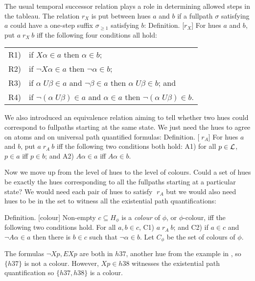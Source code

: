 \documentclass[submission,copyright,creativecommons]{eptcs}
\newcommand{\unt}{\;{U}}
\newcommand{\tom}{{X}}
\newcommand{\pos}{{E}}
\newcommand{\nec}{{A}}
\newcommand{\huephi}{H_{\phi}}
\newcommand{\colourphi}{C_{\phi}}
\newcommand{\rX}{\; r_X}
\newcommand{\rA}{\; r_A}
\newenvironment{definition}{Definition. }{}
\begin{document}
The usual temporal successor relation
plays a role in determining allowed steps in the tableau.
The relation $r_X$ is put between hues $a$ and $b$
if a fullpath $\sigma$ satisfying $a$
could have a one-step suffix $\sigma_{\geq 1}$
satisfying $b$:
\begin{definition}[$r_X$]
For hues $a$ and $b$,
put $a \rX\ b$ iff
the following four conditions all hold:\\
\begin{tabular}{ll}
R1) &
if
$X \alpha \in a$ then $\alpha \in b$;\\
R2) &
if 
$\neg X \alpha \in a$ then $\neg \alpha \in b$;\\
R3) &
if
$\alpha \unt \beta \in a$ and $\neg \beta \in a$ then
$\alpha \unt \beta \in b$; and\\
R4) &
if
$\neg (\alpha \unt \beta) \in a$ and $\alpha \in a$ then
$\neg (\alpha \unt \beta) \in b$.\\
\end{tabular}
\end{definition}

We also introduced an
equivalence relation aiming
to tell whether two
hues could correspond to
fullpaths
starting at the same state.
We just need the hues to agree
on atoms and on
universal path quantified formulas:
\begin{definition}[$\rA$]
For hues $a$ and $b$,
put $a \rA\ b$ iff
the following two conditions both hold:
A1)  for all $p \in {\cal L}$, $p \in a$ iff $p \in b$; and
A2) $\nec \alpha \in a$ iff $\nec \alpha \in b$.
\end{definition}

Now we move up from the level of hues
to the level of colours.
Could a set of hues be exactly
the hues corresponding to
all the fullpaths
starting at a particular state?
We would need each pair of hues to 
satisfy $\rA$ but we would also
need hues to be in the set 
to witness all the 
existential path quantifications:

\begin{definition}[colour]
Non-empty $c \subseteq \huephi$ is a {\em colour}
of $\phi$,
or $\phi$-colour, iff the following
two conditions hold.
For all $a,b \in c$,
C1)  $ a \rA\ b$; and
C2)
if $a \in c$ and $\neg \nec \alpha \in a$
then
 there is $b \in c$ such that $\neg \alpha \in b$.
Let $\colourphi$ be the set of colours of $\phi$.
\end{definition}

The formulas $\neg \tom p, \pos \tom p$ are both in ${h37}$,
another hue from the example in \cite{Rey:startab},
so $\{ h37 \}$
is not a colour.
However,
$\tom p \in {h38}$
witnesses the existential
path quantification
so $\{ h{37}, h{38} \}$ is a colour.
\end{document}
